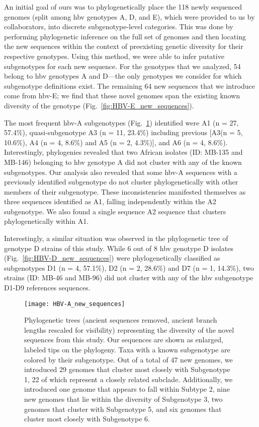An initial goal of ours was to phylogenetically place the 118 newly sequenced genomes (split among \gls{hbv} genotypes A, D, and E), which were provided to us by collaborators, into discrete subgenotype-level categories.
This was done by performing phylogenetic inference on the full set of genomes and then locating the new sequences within the context of preexisting genetic diversity for their respective genotypes.
Using this method, we were able to infer putative subgenotypes for each new sequence.
For the genotypes that we analyzed, 54 belong to \gls{hbv} genotypes A and D---the only genotypes we consider for which subgenotype definitions exist.
The remaining 64 new sequences that we introduce come from \gls{hbv}-E; we find that these novel genomes span the existing known diversity of the genotype (Fig.~\ref{fig:HBV-E_new_sequences}).

The most frequent \gls{hbv}-A subgenotypes (Fig.~\ref{fig:HBV-A_new_sequences}) identified were A1 (n = 27, 57.4\%), quasi-subgenotype A3 (n = 11, 23.4\%) including previous [A3(n = 5, 10.6\%), A4 (n = 4, 8.6\%) and A5 (n = 2, 4.3\%)], and A6 (n = 4, 8.6\%).
Interestingly, phylogenies revealed that two African isolates (ID: MB-135 and MB-146) belonging to \gls{hbv} genotype A did not cluster with any of the known subgenotypes.
Our analysis also revealed that some \gls{hbv}-A sequences with a previously identified subgenotype do not cluster phylogenetically with other members of their subgenotype.
These inconsistencies manifested themselves as three sequences identified as A1, falling independently within the A2 subgenotype.
We also found a single sequence A2 sequence that clusters phylogenetically within A1.

Interestingly, a similar situation was observed in the phylogenetic tree of genotype D strains of this study.
While 6 out of 8 \gls{hbv} genotype D isolates (Fig.~\ref{fig:HBV-D_new_sequences}) were phylogenetically classified as subgenotypes D1 (n = 4, 57.1\%), D2 (n = 2, 28.6\%) and D7 (n = 1, 14.3\%), two strains (ID: MB-46 and MB-96) did not cluster with any of the \gls{hbv} subgenotype D1-D9 references sequences.

\begin{figure}[ht]
  \centering
  \medskip
  \texttt{[image: HBV-A\_new\_sequences]}
  \caption[HBV-A New sequences]{Phylogenetic trees (ancient sequences removed, ancient branch lengths rescaled for visibility) representing the diversity of the novel sequences from this study. Our sequences are shown as enlarged, labeled tips on the phylogeny. Taxa with a known subgenotype are colored by their subgenotype. Out of a total of 47 new genomes, we introduced 29 genomes that cluster most closely with Subgenotype 1, 22 of which represent a closely related subclade. Additionally, we introduced one genome that appears to fall within Subtype 2, nine new genomes that lie within the diversity of Subgenotype 3, two genomes that cluster with Subgenotype 5, and six genomes that cluster most closely with Subgenotype 6.}
  \label{fig:HBV-A_new_sequences}
\end{figure}

